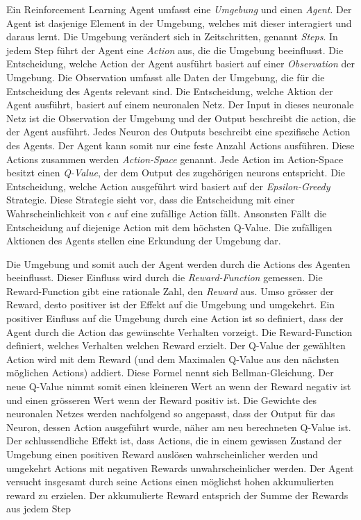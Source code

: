 Ein Reinforcement Learning Agent umfasst eine \emph{Umgebung} und einen
\emph{Agent}. Der Agent ist dasjenige Element in der Umgebung, welches mit
dieser interagiert und daraus lernt. Die Umgebung verändert sich in
Zeitschritten, genannt \emph{Steps}. In jedem Step führt der Agent eine
\emph{Action} aus, die die Umgebung beeinflusst. Die Entscheidung, welche Action
der Agent ausführt basiert auf einer \emph{Observation} der Umgebung. Die
Observation umfasst alle Daten der Umgebung, die für die Entscheidung des Agents
relevant sind. Die Entscheidung, welche Aktion der Agent ausführt, basiert auf
einem neuronalen Netz. Der Input in dieses neuronale Netz ist die Observation
der Umgebung und der Output beschreibt die action, die der Agent ausführt. Jedes
Neuron des Outputs beschreibt eine spezifische Action des Agents. Der Agent kann
somit nur eine feste Anzahl Actions ausführen. Diese Actions zusammen werden
\emph{Action-Space} genannt. Jede Action im Action-Space besitzt einen
\emph{Q-Value}, der dem Output des zugehörigen neurons entspricht. Die
Entscheidung, welche Action ausgeführt wird basiert auf der
\emph{Epsilon-Greedy} Strategie. Diese Strategie sieht vor, dass die
Entscheidung mit einer Wahrscheinlichkeit von $\epsilon$ auf eine zufällige
Action fällt. Ansonsten Fällt die Entscheidung auf diejenige Action mit dem
höchsten Q-Value. Die zufälligen Aktionen des Agents stellen eine Erkundung der
Umgebung dar.

Die Umgebung und somit auch der Agent werden durch die Actions des Agenten
beeinflusst. Dieser Einfluss wird durch die \emph{Reward-Function} gemessen. Die
Reward-Function gibt eine rationale Zahl, den \emph{Reward} aus. Umso grösser
der Reward, desto positiver ist der Effekt auf die Umgebung und umgekehrt. Ein
positiver Einfluss auf die Umgebung durch eine Action ist so definiert, dass der
Agent durch die Action das gewünschte Verhalten vorzeigt. Die Reward-Function
definiert, welches Verhalten welchen Reward erzielt. Der Q-Value der gewählten
Action wird mit dem Reward (und dem Maximalen Q-Value aus den nächsten möglichen
Actions) addiert. Diese Formel nennt sich Bellman-Gleichung. Der neue Q-Value          %
nimmt somit einen kleineren Wert an wenn der Reward negativ ist und einen
grösseren Wert wenn der Reward positiv ist. Die Gewichte des neuronalen Netzes
werden nachfolgend so angepasst, dass der Output für das Neuron, dessen Action
ausgeführt wurde, näher am neu berechneten Q-Value ist. Der schlussendliche
Effekt ist, dass Actions, die in einem gewissen Zustand der Umgebung einen
positiven Reward auslösen wahrscheinlicher werden und umgekehrt Actions mit
negativen Rewards unwahrscheinlicher werden. Der Agent versucht insgesamt durch
seine Actions einen möglichst hohen akkumulierten reward zu erzielen. Der
akkumulierte Reward entsprich der Summe der Rewards aus jedem Step


